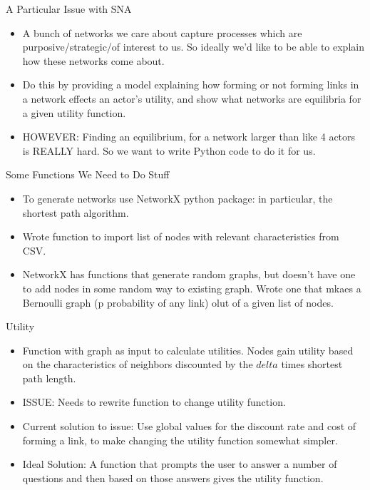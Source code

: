 \documentclass{beamer}
\begin{document}
\begin{frame}{A Particular Issue with SNA}
\begin{itemize}
\item A bunch of networks we care about capture processes which are purposive/strategic/of interest to us. So ideally we'd like to be able to explain how these networks come about.
\item Do this by providing a model explaining how forming or not forming links in a network effects an actor's utility, and show what networks are equilibria for a given utility function.
\item HOWEVER: Finding an equilibrium, for a network larger than like 4 actors is REALLY hard. So we want to write Python code to do it for us.
\end{itemize}
\end{frame}

\begin{frame}{Some Functions We Need to Do Stuff}
\begin{itemize}
\item To generate networks use NetworkX python package: in particular, the shortest path algorithm.
\item Wrote function to import list of nodes with relevant characteristics from CSV.
\item NetworkX has functions that generate random graphs, but doesn't have one to add nodes in some random way to existing graph. Wrote one that mkaes a Bernoulli graph (p probability of any link) olut of a given list of nodes.
\end{itemize}
\end{frame}

\begin{frame}{Utility}
\begin{itemize}
\item Function with graph as input to calculate utilities. Nodes gain utility based on the characteristics of neighbors discounted by the $delta$ times shortest path length.
\item ISSUE: Needs to rewrite function to change utility function.
\item Current solution to issue: Use global values for the discount rate and cost of forming a link, to make changing the utility function somewhat simpler.
\item Ideal Solution: A function that prompts the user to answer a number of questions and then based on those answers gives the utility function.
\end{itemize}
\end{frame}
\end{document}
